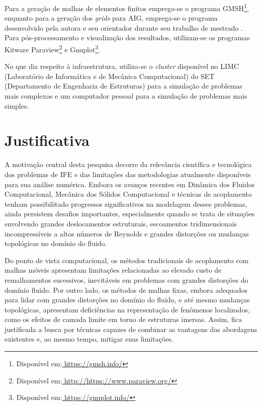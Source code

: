 Para a geração de malhas de elementos finitos emprega-se o programa GMSH\footnote{Disponível em:\url{ https://gmsh.info/}}, enquanto para a  geração dos \textit{grids} para AIG, emprega-se o programa desenvolvido pela autora e seu orientador durante seu trabalho de mestrado \cite{Tonon:2016}. Para pós-processamento e visualização dos resultados, utilizam-se os programas Kitware Paraview\footnote{Disponível em:\url{ http://https://www.paraview.org/}} e  Gnuplot\footnote{Disponível em:\url{ https://gnuplot.info/}}. 

No que diz respeito à infraestrutura, utiliza-se o \textit{cluster} disponível no LIMC (Laboratório de Informática e de Mecânica Computacional) do SET (Departamento de Engenharia de Estruturas) para a simulação de problemas mais complexos e um computador pessoal para a simulação de problemas mais simples.

\section[Justificativa]{Justificativa}

A motivação central desta pesquisa decorre da relevância científica e tecnológica dos problemas de IFE e das limitações das metodologias atualmente disponíveis para sua análise numérica. Embora os avanços recentes em Dinâmica dos Fluidos Computacional, Mecânica dos Sólidos Computacional e técnicas de acoplamento tenham possibilitado progressos significativos na modelagem desses problemas, ainda persistem desafios importantes, especialmente quando se trata de situações envolvendo grandes deslocamentos estruturais, escoamentos tridimensionais incompressíveis a altos números de Reynolds e grandes distorções ou mudanças topológicas no domínio do fluido.

Do ponto de vista computacional, os métodos tradicionais de acoplamento com malhas móveis apresentam limitações relacionadas ao elevado custo de remalhamentos sucessivos, inevitáveis em problemas com grandes distorções do domínio fluido. Por outro lado, os métodos de malhas fixas, embora adequados para lidar com grandes distorções no domínio do fluido, e até mesmo mudanças topológicas, apresentam deficiências na representação de fenômenos localizados, como os efeitos de camada limite em torno de estruturas imersas. Assim, fica justificada a busca por técnicas capazes de combinar as vantagens das abordagens existentes e, ao mesmo tempo, mitigar suas limitações.

